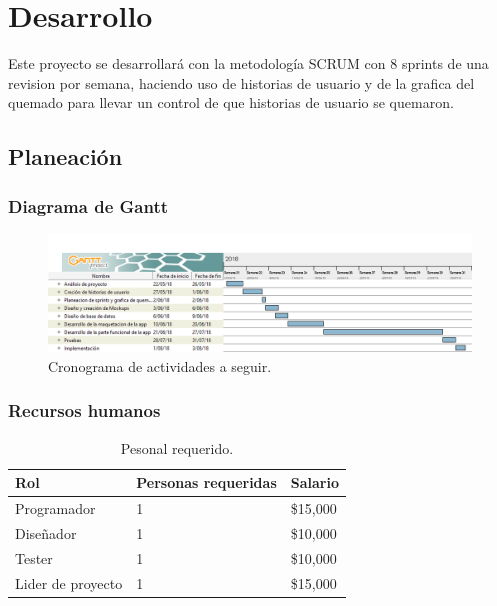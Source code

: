 \chapter{Desarrollo}
Este proyecto se desarrollará con la metodología SCRUM con 8 sprints de una revision por semana, haciendo uso de historias de usuario y de la grafica del quemado para llevar un control de que historias de usuario se quemaron.

\section{Planeación}
\subsection{Diagrama de Gantt}
\begin{figure}[H]
	\begin{center}
		\includegraphics[scale=0.6]{img/cronograma.png} 
		\caption{Cronograma de actividades a seguir.}
		\label{gantt}
	\end{center}
\end{figure}
\subsection{Recursos humanos}
\begin{table}[H]
\centering
\begin{tabular}{|l|l|l|}
\hline
Rol               & Personas requeridas & Salario  \\ \hline
Programador       & 1                   & \$15,000 \\ \hline
Diseñador         & 1                   & \$10,000 \\ \hline
Tester            & 1                   & \$10,000 \\ \hline
Lider de proyecto & 1                   & \$15,000 \\ \hline
\end{tabular}
\caption{Pesonal requerido.}
\label{personal}
\end{table}

